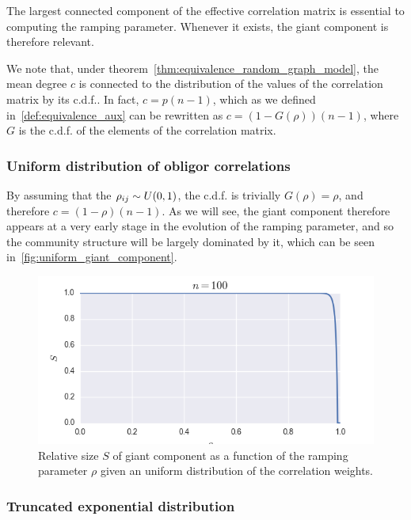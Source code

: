 The largest connected component of the effective correlation matrix is essential to computing the ramping parameter.
Whenever it exists, the giant component is therefore relevant.

We note that, under theorem~\ref{thm:equivalence_random_graph_model}, the mean degree $c$ is connected to the distribution of the values of the correlation matrix by its c.d.f..
In fact, $c = p (n-1)$, which as we defined in~\ref{def:equivalence_aux} can be rewritten as $c = (1-G(\rho)) (n-1)$, where $G$ is the c.d.f. of the elements of the correlation matrix.


\subsubsection{Uniform distribution of obligor correlations} %
\label{ssub:uniform_distribution}

By assuming that the $\rho_{ij} \sim  U(0,1)$, the c.d.f. is trivially $G(\rho) = \rho$, and therefore $c = (1 -\rho)(n-1)$.
As we will see, the giant component therefore appears at a very early stage in the evolution of the ramping parameter, and so the community structure will be largely dominated by it, which can be seen in~\vref{fig:uniform_giant_component}.
\begin{figure}[tb]
	\centering
	\includegraphics[scale=.8]{figures/3_uniform_giant_component.png}
	\caption{Relative size $S$ of giant component as a function of the ramping parameter $\rho$ given an uniform distribution of the correlation weights.}
	\label{fig:uniform_giant_component}
\end{figure}


\subsubsection{Truncated exponential distribution} %
\label{ssub:truncated_exponential_distribution}

